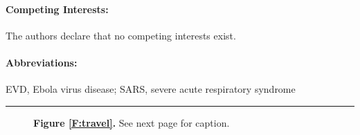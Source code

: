 \documentclass[12pt]{article}
\begin{document}
\paragraph*{Competing Interests:} 
The authors declare that no competing interests exist.

\paragraph*{Abbreviations:}
EVD, Ebola virus disease;
SARS, severe acute respiratory syndrome

\bigskip\hrule\bigskip
\renewcommand{\baselinestretch}{1}\normalsize

\renewcommand{\baselinestretch}{1.23}\normalsize

\newpage

\begin{figure}[th]
\begin{center}
\bigskip
{\bf Figure \ref{F:travel}.}   See next page for caption.
\end{center}
\end{figure}
\end{document}
